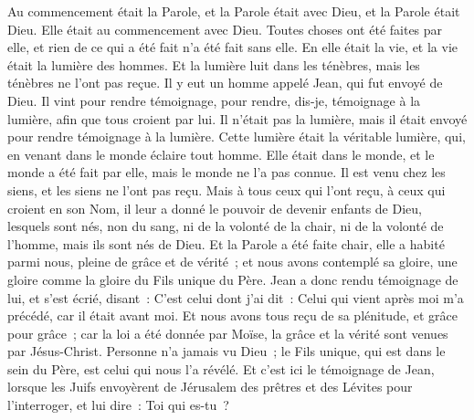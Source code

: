 \begin{multicols}{2}
\VerseOne{}Au commencement était la Parole, et la Parole était avec Dieu, et la Parole était Dieu.
Elle était au commencement avec Dieu.
Toutes choses ont été faites par elle, et rien de ce qui a été fait n'a été fait sans elle.
En elle était la vie, et la vie était la lumière des hommes.
Et la lumière luit dans les ténèbres, mais les ténèbres ne l'ont pas reçue.
Il y eut un homme appelé Jean, qui fut envoyé de Dieu.
Il vint pour rendre témoignage, pour rendre, dis-je, témoignage à la lumière, afin que tous croient par lui.
Il n'était pas la lumière, mais il était envoyé pour rendre témoignage à la lumière.
Cette lumière était la véritable lumière, qui, en venant dans le monde éclaire tout homme.
Elle était dans le monde, et le monde a été fait par elle, mais le monde ne l'a pas connue.
Il est venu chez les siens, et les siens ne l'ont pas reçu.
Mais à tous ceux qui l'ont reçu, à ceux qui croient en son Nom, il leur a donné le pouvoir de devenir enfants de Dieu,
lesquels sont nés, non du sang, ni de la volonté de la chair, ni de la volonté de l'homme, mais ils sont nés de Dieu.
Et la Parole a été faite chair, elle a habité parmi nous, pleine de grâce et de vérité~; et nous avons contemplé sa gloire, une gloire comme la gloire du Fils unique du Père.
Jean a donc rendu témoignage de lui, et s'est écrié, disant~: C'est celui dont j'ai dit~: Celui qui vient après moi m'a précédé, car il était avant moi.
Et nous avons tous reçu de sa plénitude, et grâce pour grâce~;
car la loi a été donnée par Moïse, la grâce et la vérité sont venues par Jésus-Christ.
Personne n'a jamais vu Dieu~; le Fils unique, qui est dans le sein du Père, est celui qui nous l'a révélé.
Et c'est ici le témoignage de Jean, lorsque les Juifs envoyèrent de Jérusalem des prêtres et des Lévites pour l'interroger, et lui dire~: Toi qui es-tu~?

\end{multicols}
